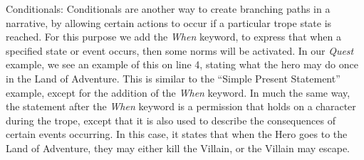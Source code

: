 \begin{compactdesc}
\item[Conditionals:]
Conditionals are another way to create branching paths in a narrative, by allowing certain actions to occur if a particular trope state is reached. For this purpose we add the \emph{When} keyword, to express that when a specified state or event occurs, then some norms will be activated. In our \emph{Quest} example, we see an example of this on line 4, stating what the hero may do once in the Land of Adventure. This is similar to the ``Simple Present Statement'' example, except for the addition of the \emph{When} keyword. In much the same way, the statement after the \emph{When} keyword is a permission that holds on a character during the trope, except that it is also used to describe the consequences of certain events occurring. In this case, it states that when the Hero goes to the Land of Adventure, they may either kill the Villain, or the Villain may escape.


\end{compactdesc}
